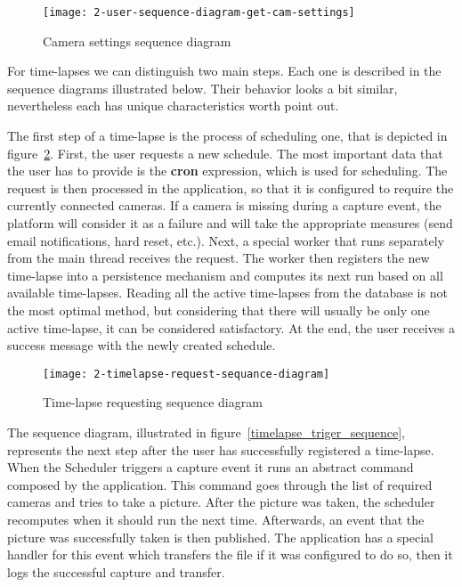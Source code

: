 \begin{figure}[!ht]
\centering
\texttt{[image: 2-user-sequence-diagram-get-cam-settings]}
\caption{Camera settings sequence diagram}\label{user_sequence}
\end{figure}

For time-lapses we can distinguish two main steps. Each one is described in the sequence diagrams illustrated below. Their behavior looks a bit similar, nevertheless each has unique characteristics worth point out.

The first step of a time-lapse is the process of scheduling one, that is depicted in \mbox{figure \ref{timelapse_request_sequence}}. First, the user requests a new schedule. The most important data that the user has to provide is the \textbf{cron} expression, which is used for scheduling. The request is then processed in the application, so that it is configured to require the currently connected cameras. If a camera is missing during a capture event, the platform will consider it as a failure and will take the appropriate measures (send email notifications, hard reset, etc.). Next, a special worker that runs separately from the main thread receives the request. The worker then registers the new time-lapse into a persistence mechanism and computes its next run based on all available time-lapses. Reading all the active time-lapses from the database is not the most optimal method, but considering that there will usually be only one active time-lapse, it can be considered satisfactory. At the end, the user receives a success message with the newly created schedule.

\begin{figure}[!ht]
\centering
\texttt{[image: 2-timelapse-request-sequance-diagram]}
\caption{Time-lapse requesting sequence diagram}\label{timelapse_request_sequence}
\end{figure}

The sequence diagram, illustrated in \mbox{figure \ref{timelapse_triger_sequence}}, represents the next step after the user has successfully registered a time-lapse. When the Scheduler triggers a capture event it runs an abstract command composed by the application. This command goes through the list of required cameras and tries to take a picture. After the picture was taken, the scheduler recomputes when it should run the next time. Afterwards, an event that the picture was successfully taken is then published. The application has a special handler for this event which transfers the file if it was configured to do so, then it logs the successful capture and transfer.

